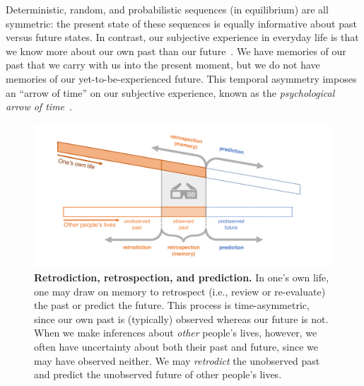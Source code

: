 \documentclass[10pt]{article}
\begin{document}
Deterministic, random, and probabilistic sequences (in equilibrium) are all symmetric: the present state of these sequences is equally informative about past versus future states.  In contrast, our subjective experience in everyday life is that we know more about our own past than our future~\citep[e.g.,][]{Horw87}.  We have memories of our past that we carry with us into the present moment, but we do not have memories of our yet-to-be-experienced future.  This temporal asymmetry imposes an ``arrow of time'' on our subjective experience, known as the \textit{psychological arrow of time}~\citep[e.g.,][]{Hawk85}.

\begin{figure}[tp]
  \centering
  \includegraphics[width=\textwidth]{intro1}
  \caption{\textbf{Retrodiction, retrospection, and prediction.} In one's own life, one may draw on memory to retrospect (i.e., review or re-evaluate) the past or predict the future.  This process is time-asymmetric, since our own past is (typically) observed whereas our future is not.  When we make inferences about \textit{other} people's lives, however, we often have uncertainty about both their past and future, since we may have observed neither.  We may \textit{retrodict} the unobserved past and predict the unobserved future of other people's lives.}
  \label{fig:intro1}
\end{figure}
\end{document}
